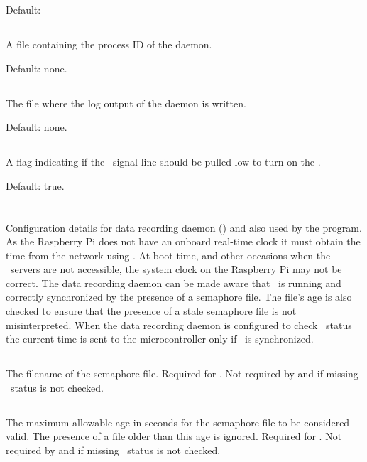 Default: 

\subsection{}
A file containing the process ID of the 
daemon.

Default: none.

\subsection{}
The file where the log output of the 
daemon is written.

Default: none.

\subsection{}
A flag indicating if the \dtr\ signal line should be pulled low to
turn on the \led.

Default: true.

\section{}

Configuration details for data recording daemon ()
and also used by the  program. As the
Raspberry Pi does not have an onboard real-time clock it must obtain
the time from the network using \ntp. At boot time, and other
occasions when the \ntp\ servers are not accessible, the system clock
on the Raspberry Pi may not be correct. The data recording daemon can
be made aware that \ntp\ is running and correctly synchronized by the
presence of a semaphore file. The file's age is also checked to ensure
that the presence of a stale semaphore file is not
misinterpreted. When the data recording daemon is configured to check
\ntp\ status the current time is sent to the microcontroller only if
\ntp\ is synchronized.

\subsection{}
The filename of the semaphore file. Required for
. Not required by  and
if missing \ntp\ status is not checked.

\subsection{}
The maximum allowable age in seconds for the semaphore file to be
considered valid. The presence of a file older than this age is
ignored. Required for . Not required by
 and if missing \ntp\ status is not checked.




